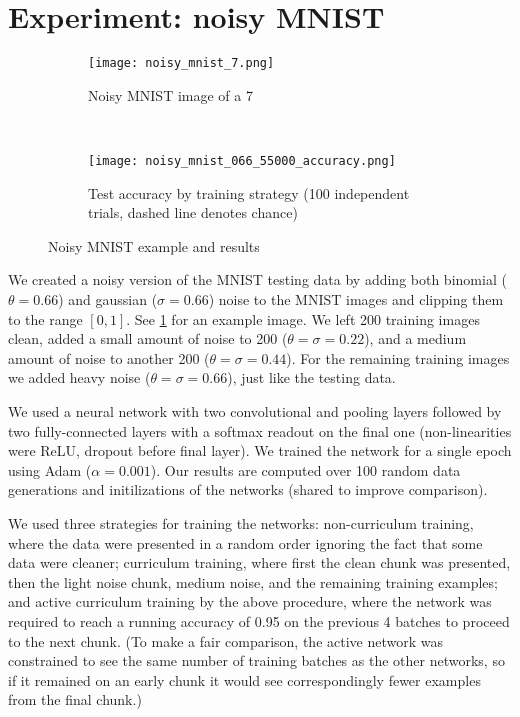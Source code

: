 \documentclass{article}
\begin{document}
\section{Experiment: noisy MNIST}
\begin{figure}
\centering
\begin{subfigure}{0.45\textwidth}
\centering
\texttt{[image: noisy\_mnist\_7.png]}
\caption{Noisy MNIST image of a 7}
\label{noisymnist}
\end{subfigure}
~
\begin{subfigure}{0.5\textwidth}
\centering
\texttt{[image: noisy\_mnist\_066\_55000\_accuracy.png]}
\caption{Test accuracy by training strategy (100 independent trials, dashed line denotes chance)}
\label{accuracyfig}
\end{subfigure}
\caption{Noisy MNIST example and results}
\end{figure}
We created a noisy version of the MNIST testing data by adding both binomial ($\theta = 0.66$) and gaussian ($\sigma=0.66$) noise to the MNIST images and clipping them to the range $[0,1]$. See \ref{noisymnist} for an example image. We left 200 training images clean, added a small amount of noise to 200 ($\theta = \sigma = 0.22$), and a medium amount of noise to another 200 ($\theta = \sigma = 0.44$). For the remaining training images we added heavy noise ($\theta = \sigma = 0.66$), just like the testing data. \par
We used a neural network with two convolutional and pooling layers followed by two fully-connected layers with a softmax readout on the final one (non-linearities were ReLU, dropout before final layer). We trained the network for a single epoch using Adam ($\alpha = 0.001$). Our results are computed over 100 random data generations and initilizations of the networks (shared to improve comparison).\par 
We used three strategies for training the networks: non-curriculum training, where the data were presented in a random order ignoring the fact that some data were cleaner; curriculum training, where first the clean chunk was presented, then the light noise chunk, medium noise, and the remaining training examples; and active curriculum training by the above procedure, where the network was required to reach a running accuracy of 0.95 on the previous 4 batches to proceed to the next chunk. (To make a fair comparison, the active network was constrained to see the same number of training batches as the other networks, so if it remained on an early chunk it would see correspondingly fewer examples from the final chunk.)\par 
\end{document}
